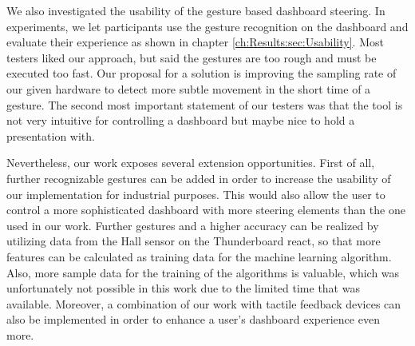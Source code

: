 We also investigated the usability of the gesture based dashboard steering. 
In experiments, we let participants use the gesture recognition on the dashboard and evaluate their experience as shown in chapter \ref{ch:Results:sec:Usability}.
Most testers liked our approach, but said the gestures are too rough and must be executed too fast.
Our proposal for a solution is improving the sampling rate of our given hardware to detect more subtle movement in the short time of a gesture.
The second most important statement of our testers was that the tool is not very intuitive for controlling a dashboard but maybe nice to hold a presentation with.

Nevertheless, our work exposes several extension opportunities. 
First of all, further recognizable gestures can be added in order to increase the usability of our implementation for industrial purposes. 
This would also allow the user to control a more sophisticated dashboard with more steering elements than the one used in our work.
Further gestures and a higher accuracy can be realized by utilizing data from the Hall sensor on the Thunderboard react, so that more features can be calculated as training data for the machine learning algorithm. 
Also, more sample data for the training of the algorithms is valuable, which was unfortunately not possible in this work due to the limited time that was available. 
Moreover, a combination of our work with tactile feedback devices can also be implemented in order to enhance a user’s dashboard experience even more. 


